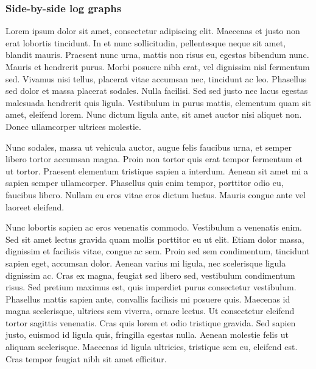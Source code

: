\documentclass[]{elsarticle} %
\begin{document}
\hypertarget{side-by-side-log-graphs}{%
\subsubsection{Side-by-side log graphs}\label{side-by-side-log-graphs}}

Lorem ipsum dolor sit amet, consectetur adipiscing elit. Maecenas et
justo non erat lobortis tincidunt. In et nunc sollicitudin, pellentesque
neque sit amet, blandit mauris. Praesent nunc urna, mattis non risus eu,
egestas bibendum nunc. Mauris et hendrerit purus. Morbi posuere nibh
erat, vel dignissim nisl fermentum sed. Vivamus nisi tellus, placerat
vitae accumsan nec, tincidunt ac leo. Phasellus sed dolor et massa
placerat sodales. Nulla facilisi. Sed sed justo nec lacus egestas
malesuada hendrerit quis ligula. Vestibulum in purus mattis, elementum
quam sit amet, eleifend lorem. Nunc dictum ligula ante, sit amet auctor
nisi aliquet non. Donec ullamcorper ultrices molestie.

Nunc sodales, massa ut vehicula auctor, augue felis faucibus urna, et
semper libero tortor accumsan magna. Proin non tortor quis erat tempor
fermentum et ut tortor. Praesent elementum tristique sapien a interdum.
Aenean sit amet mi a sapien semper ullamcorper. Phasellus quis enim
tempor, porttitor odio eu, faucibus libero. Nullam eu eros vitae eros
dictum luctus. Mauris congue ante vel laoreet eleifend.

Nunc lobortis sapien ac eros venenatis commodo. Vestibulum a venenatis
enim. Sed sit amet lectus gravida quam mollis porttitor eu ut elit.
Etiam dolor massa, dignissim et facilisis vitae, congue ac sem. Proin
sed sem condimentum, tincidunt sapien eget, accumsan dolor. Aenean
varius mi ligula, nec scelerisque ligula dignissim ac. Cras ex magna,
feugiat sed libero sed, vestibulum condimentum risus. Sed pretium
maximus est, quis imperdiet purus consectetur vestibulum. Phasellus
mattis sapien ante, convallis facilisis mi posuere quis. Maecenas id
magna scelerisque, ultrices sem viverra, ornare lectus. Ut consectetur
eleifend tortor sagittis venenatis. Cras quis lorem et odio tristique
gravida. Sed sapien justo, euismod id ligula quis, fringilla egestas
nulla. Aenean molestie felis ut aliquam scelerisque. Maecenas id ligula
ultricies, tristique sem eu, eleifend est. Cras tempor feugiat nibh sit
amet efficitur.
\end{document}

